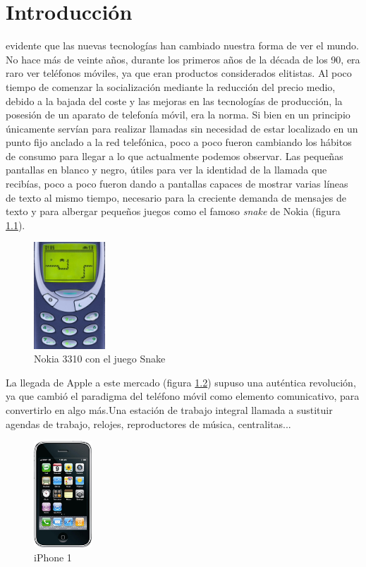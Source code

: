 \chapter{Introducción}


 evidente que las nuevas tecnologías han cambiado nuestra forma de ver el mundo. No hace más de veinte años, durante los primeros años de la década de los 90, era raro ver teléfonos móviles, ya que eran productos considerados elitistas. Al poco tiempo de comenzar la socialización mediante la reducción del precio medio, debido a la bajada del coste y las mejoras en las tecnologías de producción, la posesión de un aparato de telefonía móvil, era la norma. Si bien en un principio únicamente servían para realizar llamadas sin necesidad de estar localizado en un punto fijo anclado a la red telefónica, poco a poco fueron cambiando los hábitos de consumo para llegar a lo que actualmente podemos observar. Las pequeñas pantallas en blanco y negro, útiles para ver la identidad de la llamada que recibías, poco a poco fueron dando a pantallas capaces de mostrar varias líneas de texto al mismo tiempo, necesario para la creciente demanda de mensajes de texto y para albergar pequeños juegos como el famoso \textit{snake} de Nokia (figura \ref{fig:Nokia_snake}). 

\begin{figure}[hbtp]
\centering
\includegraphics[height=40mm, fbox={\fboxrule} 4mm]{images/introduccion/Nokia_snake.jpg}
\caption{Nokia 3310 con el juego Snake}
\label{fig:Nokia_snake}
\end{figure}

La llegada de Apple a este mercado (figura \ref{fig:Iphone}) supuso una auténtica revolución, ya que cambió el paradigma del teléfono móvil como elemento comunicativo, para convertirlo en algo más.Una estación de trabajo integral llamada a sustituir agendas de trabajo, relojes, reproductores de música, centralitas...\\

\begin{figure}[hbtp]
\centering
\includegraphics[height=40mm, fbox={\fboxrule} 4mm]{images/introduccion/Iphone1.jpg}
\caption{iPhone 1}
\label{fig:Iphone}
\end{figure}


